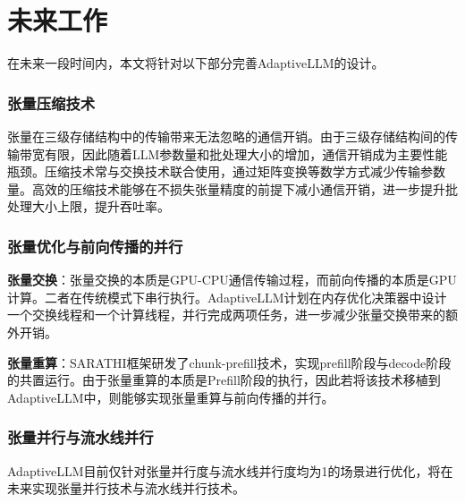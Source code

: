 \section{未来工作}
在未来一段时间内，本文将针对以下部分完善AdaptiveLLM的设计。 \par
\subsubsection{张量压缩技术}
张量在三级存储结构中的传输带来无法忽略的通信开销。由于三级存储结构间的传输带宽有限，因此随着LLM参数量和批处理大小的增加，通信开销成为主要性能瓶颈。压缩技术常与交换技术联合使用，通过矩阵变换等数学方式减少传输参数量。高效的压缩技术能够在不损失张量精度的前提下减小通信开销，进一步提升批处理大小上限，提升吞吐率。
\subsubsection{张量优化与前向传播的并行}
\textbf{张量交换}：张量交换的本质是GPU-CPU通信传输过程，而前向传播的本质是GPU计算。二者在传统模式下串行执行。AdaptiveLLM计划在内存优化决策器中设计一个交换线程和一个计算线程，并行完成两项任务，进一步减少张量交换带来的额外开销。 \par 
\textbf{张量重算}：SARATHI\cite{SARATHI}框架研发了chunk-prefill技术，实现prefill阶段与decode阶段的共置运行。由于张量重算的本质是Prefill阶段的执行，因此若将该技术移植到AdaptiveLLM中，则能够实现张量重算与前向传播的并行。
\subsubsection{张量并行与流水线并行\cite{Parallelism}} AdaptiveLLM目前仅针对张量并行度与流水线并行度均为1的场景进行优化，将在未来实现张量并行技术与流水线并行技术。